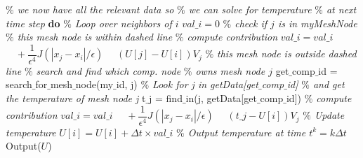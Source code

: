 \documentclass[11pt,twocolumn]{amsart}
\theoremstyle{definition}
\theoremstyle{definition}
\numberwithin{equation}{section}
\numberwithin{equation}{section}
\begin{document}
\begin{algorithm}
	\begin{algorithmic}[1]
			\STATE \textcolor{mygray}{\it $\%$ we now have all the relevant data so}
			\STATE \textcolor{mygray}{\it $\%$ we can solve for temperature}
			\STATE \textcolor{mygray}{\it $\%$ at next time step}
			 \textbf{do}
				\STATE \textcolor{mygray}{\it $\%$ Loop over neighbors of $i$}
				\STATE $val\_i = 0$
					\STATE \textcolor{mygray}{\it $\%$ check if $j$ is in myMeshNode}
						\STATE \textcolor{mygray}{\it $\%$ this mesh node is within dashed line}
						\STATE
						\STATE \textcolor{mygray}{\it $\%$ compute contribution}
						\STATE $val\_i = val\_i $
						\STATE $\quad +  \dfrac{1}{\epsilon^4} J(|x_j - x_i|/\epsilon)$
						\STATE $\quad (U[j] - U[i])V_j$
					\ELSE 
						\STATE \textcolor{mygray}{\it $\%$ this mesh node is outside dashed line}
						\STATE \textcolor{mygray}{\it $\%$ search and find which comp. node }
						\STATE \textcolor{mygray}{\it $\%$ owns mesh node $j$}
						\STATE get$\_$comp$\_$id = 
						\STATE \; search$\_$for$\_$mesh$\_$node(my$\_$id, j)
						\STATE
						\STATE \textcolor{mygray}{\it $\%$ Look for j in getData[get$\_$comp$\_$id]}
						\STATE \textcolor{mygray}{\it $\%$ and get the temperature of mesh node j}			
						\STATE t$\_$j = find$\_$in(j, getData[get$\_$comp$\_$id])
						\STATE
						\STATE \textcolor{mygray}{\it $\%$ compute contribution}
						\STATE $val\_i = val\_i $
						\STATE $\quad +  \dfrac{1}{\epsilon^4} J(|x_j - x_i|/\epsilon)$
						\STATE $\quad (t\_j - U[i])V_j$	
					\ENDIF
				\ENDFOR
				\STATE \textcolor{mygray}{\it $\%$ Update temperature}
				\STATE $U[i] = U[i] + \Delta t \times val\_i$
			\EndHloop	
			\STATE \textcolor{mygray}{\it $\%$ Output temperature at time $t^k = k\Delta t$}
			\STATE Output($U$)
		\ENDFOR
	\end{algorithmic}
\end{algorithm}

\FloatBarrier
%
%
\end{document}
